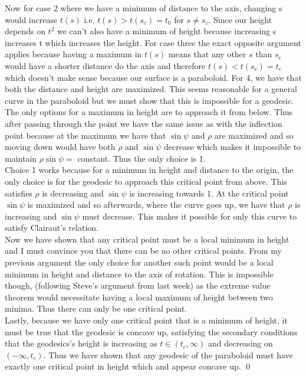 \documentclass[a4paper, 11pt]{article}
\begin{document}
	\noindent Now for case 2 where we have a minimum of distance to the axis, changing s would increase $t(s)$ i.e. $t(s)>t(s_c)=t_0$ for $s\neq s_c$. Since our height depends on $t^2$ we can't also have a minimum of height because increasing s increases t which increases the height. For case three the exact opposite argument applies because having a maximum in $t(s)$ means that any other $s$ than $s_c$ would have a shorter distance do the axis and therefore $t(s)<t(s_c)=t_c$ which doesn't make sense because our surface is a paraboloid. For 4, we have that both the distance and height are maximized. This seems reasonable for a general curve in the paraboloid but we must show that this is impossible for a geodesic. The only options for a maximum in height are to approach it from below. Thus after passing through the point we have the same issue as with the inflection point because at the maximum we have that $\sin\psi$ and $\rho$ are maximized and so moving down would have both $\rho$ and $\sin\psi$ decrease which makes it impossible to maintain $\rho\sin\psi=$ constant.  Thus the only choice is 1.\\
	
	\noindent Choice 1 works because for a minimum in height and distance to the origin, the only choice is for the geodesic to approach this critical point from above. This satisfies $\rho$ is decreasing and $\sin\psi$ is increasing towards 1. At the critical point $\sin\psi$ is maximized and so afterwards, where the curve goes up, we have that $\rho$ is increasing and $\sin\psi$ must decrease. This makes it possible for only this curve to satisfy Clairaut's relation. \\ 
	
	\noindent Now we have shown that any critical point must be a local minimum in height and I must convince you that there can be no other critical points. From my previous argument the only choice for another such point would be a local minimum in height and distance to the axis of rotation. This is impossible though, (following Steve's argument from last week) as the extreme value theorem would necessitate having a local maximum of height between two minima. Thus there can only be one critical point.\\ 
	
	\noindent Lastly,  because we have only one critical point that is a minimum of height, it must be true that the geodesic is concave up, satisfying the secondary conditions that the geodesics's height is increasing as $t\in (t_c, \infty)$ and decreasing on $(-\infty, t_c)$. Thus we have shown that any geodesic of the paraboloid must have exactly one critical point in height which and appear concave up. \qed 
	 
	
	
	
	
	
	
	
\end{document}
